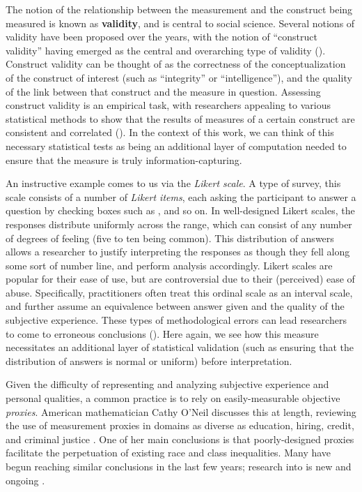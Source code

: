 The notion of the relationship between the measurement and the construct being measured is known as \textbf{validity}, and is central to social science.
Several notions of validity have been proposed over the years, with the notion of ``construct validity'' having emerged as the central and overarching type of validity (\cite{cronbach:1955}).
Construct validity can be thought of as the correctness of the conceptualization of the construct of interest (such as ``integrity'' or ``intelligence''), and the quality of the link between that construct and the measure in question.
Assessing construct validity is an empirical task, with researchers appealing to various statistical methods to show that the results of measures of a certain construct are consistent and correlated (\cite{campbell:1959}).
In the context of this work, we can think of this necessary statistical tests as being an additional layer of computation needed to ensure that the measure is truly information-capturing.

An instructive example comes to us via the \textit{Likert scale}. 
A type of survey, this scale consists of a number of \textit{Likert items}, each asking the participant to answer a question by checking boxes such as ,  and so on.
In well-designed Likert scales, the responses distribute uniformly across the range, which can consist of any number of degrees of feeling (five to ten being common).
This distribution of answers allows a researcher to justify interpreting the responses as though they fell along some sort of number line, and perform analysis accordingly.
Likert scales are popular for their ease of use, but are controversial due to their (perceived) ease of abuse.
Specifically, practitioners often treat this ordinal scale as an interval scale, and further assume an equivalence between answer given and the quality of the subjective experience.
These types of methodological errors can lead researchers to come to erroneous conclusions (\cite{jamieson:2004}).
Here again, we see how this measure necessitates an additional layer of statistical validation (such as ensuring that the distribution of answers is normal or uniform) before interpretation. 

\bigskip

Given the difficulty of representing and analyzing subjective experience and personal qualities, a common practice is to rely on easily-measurable objective \textit{proxies}.
American mathematician Cathy O'Neil discusses this at length, reviewing the use of measurement proxies in domains as diverse as education, hiring, credit, and criminal justice \cite{oneil}.
One of her main conclusions is that poorly-designed proxies facilitate the perpetuation of existing race and class inequalities.
Many have begun reaching similar conclusions in the last few years; research into  is new and ongoing \cite{tramer} \cite{friedler}.

